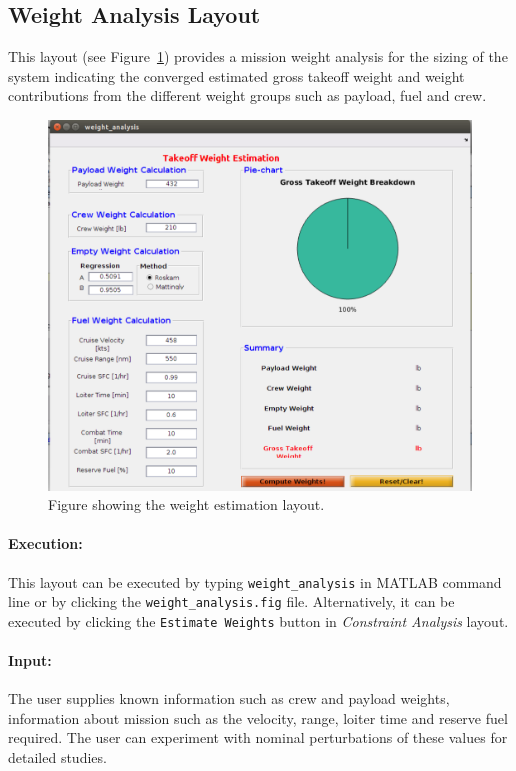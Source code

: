 \documentclass[pdftex,11pt,letter]{article}
\begin{document}
\subsection{Weight Analysis Layout}
This layout (see Figure~\ref{weight_layout}) provides a mission weight analysis for the sizing of the system indicating the converged estimated gross takeoff weight and weight contributions from the different weight groups such as payload, fuel and crew.
\begin{figure}[h!]
	\centering
	\includegraphics[scale=0.60]{figures/weight_layout.pdf}
	\caption{Figure showing the weight estimation layout.}
	\label{weight_layout}
\end{figure}
\paragraph{Execution:} This layout can be executed by typing \texttt{weight\_analysis} in MATLAB command line or by clicking the \texttt{weight\_analysis.fig} file. Alternatively, it can be executed by clicking the \texttt{Estimate Weights} button in \textit{Constraint Analysis} layout.
\paragraph{Input:}The user supplies known information such as  crew and payload weights, information about mission such as the velocity, range, loiter time and reserve fuel required. The user can experiment with nominal perturbations of these values for detailed studies.
\end{document}
